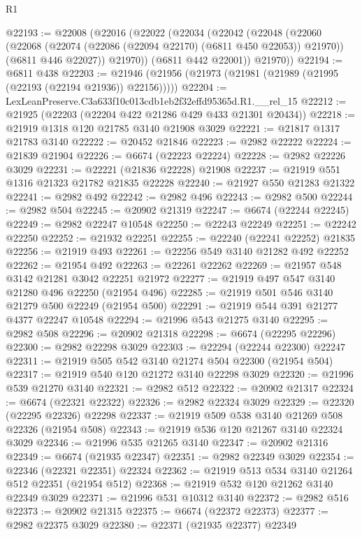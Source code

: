 \begin{lexlean}{R1}
\begin{coremodule}
@22193 := @22008
    (@22016
      (@22022
        (@22034
          (@22042
            (@22048
              (@22060
                (@22068 (@22074 (@22086 (@22094 @22170) (@6811 @450 @22053)) @21970))
                (@6811 @446 @22027))
              @21970))
          (@6811 @442 @22001))
        @21970))
@22194 := @6811 @438
@22203 := @21946 (@21956 (@21973 (@21981 (@21989 (@21995 (@22193 (@22194 @21936)) @22156)))))
@22204 := LexLeanPreserve.C3a633f10c013cdb1eb2f32effd95365d.R1.__rel_15
@22212 := @21925 (@22203 (@22204 @422 @21286 @429 @433 @21301 @20434))
@22218 := @21919 @1318 @120 @21785 @3140 @21908 @3029
@22221 := @21817 @1317 @21783 @3140
@22222 := @20452 @21846
@22223 := @2982 @22222
@22224 := @21839 @21904
@22226 := @6674 (@22223 @22224)
@22228 := @2982 @22226 @3029
@22231 := @22221 (@21836 @22228) @21908
@22237 := @21919 @551 @1316 @21323 @21782 @21835 @22228
@22240 := @21927 @550 @21283 @21322
@22241 := @2982 @492
@22242 := @2982 @496
@22243 := @2982 @500
@22244 := @2982 @504
@22245 := @20902 @21319
@22247 := @6674 (@22244 @22245)
@22249 := @2982 @22247 @10548
@22250 := @22243 @22249
@22251 := @22242 @22250
@22252 := @21932 @22251
@22255 := @22240 (@22241 @22252) @21835
@22256 := @21919 @493
@22261 := @22256 @549 @3140 @21282 @492 @22252
@22262 := @21954 @492
@22263 := @22261 @22262
@22269 := @21957 @548 @3142 @21281 @3042 @22251 @21972
@22277 := @21919 @497 @547 @3140 @21280 @496 @22250 (@21954 @496)
@22285 := @21919 @501 @546 @3140 @21279 @500 @22249 (@21954 @500)
@22291 := @21919 @544 @391 @21277 @4377 @22247 @10548
@22294 := @21996 @543 @21275 @3140
@22295 := @2982 @508
@22296 := @20902 @21318
@22298 := @6674 (@22295 @22296)
@22300 := @2982 @22298 @3029
@22303 := @22294 (@22244 @22300) @22247
@22311 := @21919 @505 @542 @3140 @21274 @504 @22300 (@21954 @504)
@22317 := @21919 @540 @120 @21272 @3140 @22298 @3029
@22320 := @21996 @539 @21270 @3140
@22321 := @2982 @512
@22322 := @20902 @21317
@22324 := @6674 (@22321 @22322)
@22326 := @2982 @22324 @3029
@22329 := @22320 (@22295 @22326) @22298
@22337 := @21919 @509 @538 @3140 @21269 @508 @22326 (@21954 @508)
@22343 := @21919 @536 @120 @21267 @3140 @22324 @3029
@22346 := @21996 @535 @21265 @3140
@22347 := @20902 @21316
@22349 := @6674 (@21935 @22347)
@22351 := @2982 @22349 @3029
@22354 := @22346 (@22321 @22351) @22324
@22362 := @21919 @513 @534 @3140 @21264 @512 @22351 (@21954 @512)
@22368 := @21919 @532 @120 @21262 @3140 @22349 @3029
@22371 := @21996 @531 @10312 @3140
@22372 := @2982 @516
@22373 := @20902 @21315
@22375 := @6674 (@22372 @22373)
@22377 := @2982 @22375 @3029
@22380 := @22371 (@21935 @22377) @22349

\end{coremodule}
\end{lexlean}
